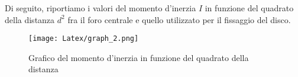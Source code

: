 Di seguito, riportiamo i valori del momento d'inerzia $I$ in funzione del quadrato della distanza $d^2$ fra il foro centrale e quello utilizzato per il fissaggio del disco. 

\begin{figure}[H]
    \centering
    \texttt{[image: Latex/graph\_2.png]}
    \caption{Grafico del momento d'inerzia in funzione del quadrato della distanza}
    \label{fig:etichetta}
\end{figure}